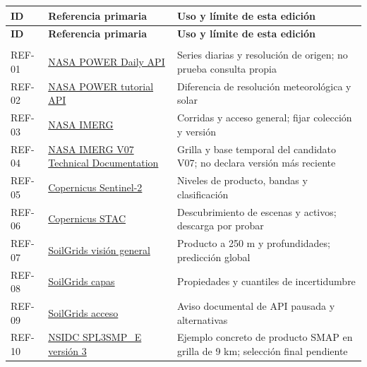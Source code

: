 \documentclass[10pt,a4paper]{article}
\begin{document}
\begingroup\small
\begin{longtable}{>{\raggedright\arraybackslash}p{3.647cm}>{\raggedright\arraybackslash}p{5.867cm}>{\raggedright\arraybackslash}p{6.343cm}}
\toprule
\textbf{ID} & \textbf{Referencia primaria} & \textbf{Uso y límite de esta edición} \\
\midrule\endfirsthead
\toprule
\textbf{ID} & \textbf{Referencia primaria} & \textbf{Uso y límite de esta edición} \\
\midrule\endhead
\midrule\multicolumn{3}{r}{\scriptsize Continúa en la página siguiente}\\\endfoot
\bottomrule\endlastfoot
REF-01 & \href{https://power.larc.nasa.gov/docs/services/api/temporal/daily/}{NASA POWER Daily API} & Series diarias y resolución de origen; no prueba consulta propia \\[3pt]
REF-02 & \href{https://power.larc.nasa.gov/docs/tutorials/service-data-request/api/}{NASA POWER tutorial API} & Diferencia de resolución meteorológica y solar \\[3pt]
REF-03 & \href{https://gpm.nasa.gov/data/imerg}{NASA IMERG} & Corridas y acceso general; fijar colección y versión \\[3pt]
REF-04 & \href{https://gpm.nasa.gov/resources/documents/imerg-v07-technical-documentation}{NASA IMERG V07 Technical Documentation} & Grilla y base temporal del candidato V07; no declara versión más reciente \\[3pt]
REF-05 & \href{https://documentation.dataspace.copernicus.eu/Data/SentinelMissions/Sentinel2.html}{Copernicus Sentinel-2} & Niveles de producto, bandas y clasificación \\[3pt]
REF-06 & \href{https://documentation.dataspace.copernicus.eu/APIs/STAC.html}{Copernicus STAC} & Descubrimiento de escenas y activos; descarga por probar \\[3pt]
REF-07 & \href{https://docs.isric.org/globaldata/soilgrids/SoilGrids_faqs.html}{SoilGrids visión general} & Producto a 250 m y profundidades; predicción global \\[3pt]
REF-08 & \href{https://docs.isric.org/globaldata/soilgrids/SoilGrids_faqs_01.html}{SoilGrids capas} & Propiedades y cuantiles de incertidumbre \\[3pt]
REF-09 & \href{https://docs.isric.org/globaldata/soilgrids/SoilGrids_faqs_02.html}{SoilGrids acceso} & Aviso documental de API pausada y alternativas \\[3pt]
REF-10 & \href{https://nsidc.org/data/spl3smp_e/versions/3}{NSIDC SPL3SMP\_\allowbreak{}E versión 3} & Ejemplo concreto de producto SMAP en grilla de 9 km; selección final pendiente \\[3pt]

\end{longtable}
\end{document}
